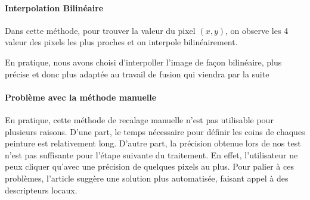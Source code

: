 \documentclass[12pt,a4paper]{article}
\begin{document}
\paragraph{Interpolation Bilinéaire}
Dans cette méthode, pour trouver la valeur du pixel $(x,y)$, on observe les 4 valeur des pixels les plus proches et on interpole bilinéairement.

En pratique, nous avons choisi d'interpoller l'image de façon bilinéaire, plus précise et donc plus adaptée au travail de fusion qui viendra par la suite

\paragraph{Problème avec la méthode manuelle}

En pratique, cette méthode de recalage manuelle n'est pas utilisable pour plusieurs raisons. D'une part, le temps nécessaire pour définir les coins de chaques peinture est relativement long. D'autre part, la précision obtenue lors de nos test n'est pas suffisante pour l'étape suivante du traitement. En effet, l'utilisateur ne peux cliquer qu'avec une précision de quelques pixels au plus. Pour palier à ces problèmes, l'article suggère une solution plus automatisée, faisant appel à des descripteurs locaux.
\end{document}

